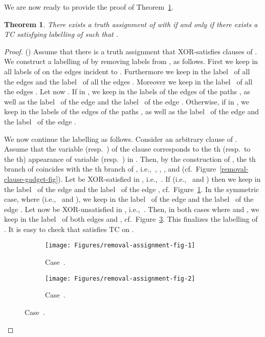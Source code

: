\documentclass[a4paper,UKenglish]{article}
\newtheorem{theorem}{Theorem}
\begin{document}
We are now ready to provide the proof of Theorem~\ref{cost-removing-labels-upper-lower-bound-thm}.

\begin{theorem}
\label{cost-removing-labels-upper-lower-bound-thm}
There exists a truth assignment  of  with  if and only if there exists a TC satisfying labelling  of  such that .
\end{theorem}

\begin{proof}
() Assume that there is a truth assignment  that
XOR-satisfies  clauses of . We construct a labelling  of  by removing  labels from , as follows.
First we keep in  all labels of  on the edges
incident to . Furthermore we keep in  the label~ of
all the edges  and the label~ of all the
edges . Moreover we keep in  the label~
 of all the edges . Let now . If  in , we keep in  the labels of the edges
of the paths , as well as the label~ of the edge 
 and the label~ of the edge . Otherwise, if  in , we keep in  the labels of the edges of the paths , as
well as the label~ of the edge  and the label~ of the edge .

We now continue the labelling  as follows. Consider an arbitrary
clause  of . Assume that the variable  (resp.~) of the clause  corresponds to the th
(resp.~to the th) appearance of variable  (resp.~) in . Then, by the construction of , the th branch of  coincides with the th branch of , i.e.,~, , , and  (cf.~Figure~\ref{removal-clause-gadget-fig}). Let  be XOR-satisfied in ,
i.e.,~. If  (i.e.,~
and ) then we keep in  the label~ of the edge  and the label~ of the edge , cf.~Figure~\ref{removal-assignment-fig-1}. In
the symmetric case, where  (i.e.,~ and ), we keep in  the label~ of the edge  and the label~ of the edge . Let now  be XOR-unsatisfied in , i.e.,~. Then, in both cases where  and , we keep in  the label~ of both edges  and , cf.~Figure~\ref {removal-assignment-fig-2}. This finalizes the labelling  of . It is easy to check that  satisfies TC on .

\begin{figure}[tbh]
\centering
\begin{subfigure}[t]{.99\linewidth}
\centering \texttt{[image: Figures/removal-assignment-fig-1]} \hspace{0,2cm}
\caption{Case~.}
\label{removal-assignment-fig-1}
\end{subfigure}

\begin{subfigure}[b]{.99\linewidth}
\centering \texttt{[image: Figures/removal-assignment-fig-2]}
\caption{Case~.}
\label{removal-assignment-fig-2}
\end{subfigure}


\end{figure}
\end{proof}
\end{document}
